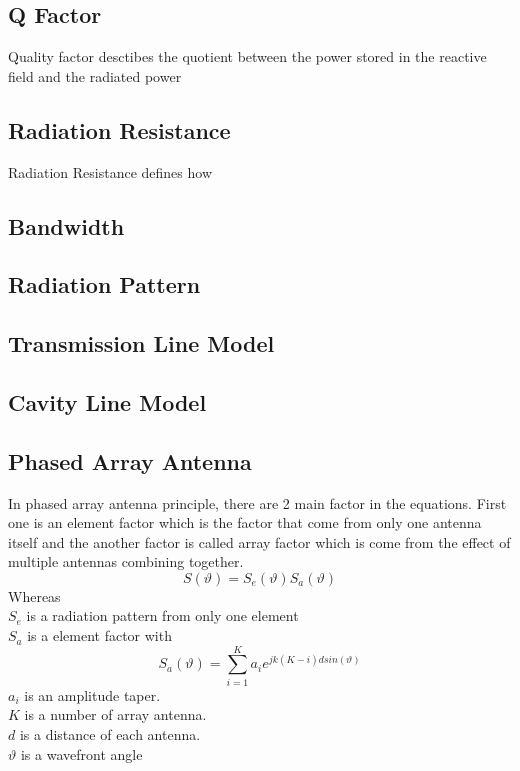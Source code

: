   \subsection{Q Factor}
  \indent Quality factor desctibes the quotient between the power stored in the reactive field and the radiated power
  \subsection{Radiation Resistance}
    \indent Radiation Resistance defines how 

  \subsection{Bandwidth}

  \subsection{Radiation Pattern}

  \subsection{Transmission Line Model}

  \subsection{Cavity Line Model}

  \subsection{Phased Array Antenna}
    In phased array antenna principle, there are 2 main factor in the equations. First one is an element factor which is the factor that come from only one antenna itself and the another factor is called array factor which is come from the effect of multiple antennas combining together.
    \begin{equation} 
      S(\vartheta)=S_{e}(\vartheta)S_a(\vartheta)  \label{ii}
    \end{equation}
      Whereas \\[1ex]
      \indent $S_{e}$ is a radiation pattern from only one element\\
      \indent $S_{a}$ is a element factor with
      \begin{equation} 
        S_{a}(\vartheta) = \sum\limits_{i=1}^K a_{i}e^{jk(K-i)dsin(\vartheta)}
      \end{equation}
      \indent $a_{i}$ is an amplitude taper.\\
      \indent $K$ is a number of array antenna.\\
      \indent $d$ is a distance of each antenna.\\
      \indent $\vartheta$ is a wavefront angle

